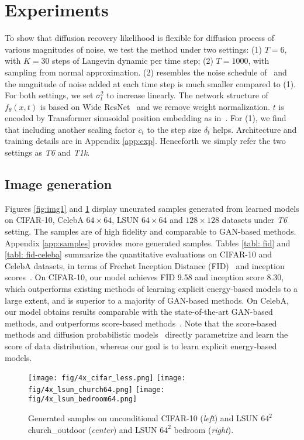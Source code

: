 \documentclass{article} \usepackage{iclr2021_conference,times}
\begin{document}
\section{Experiments}
To show that diffusion recovery likelihood is flexible for diffusion process of various magnitudes of noise, we test the method under two settings: (1) $T=6$, with $K=30$ steps of Langevin dynamic per time step; (2) $T = 1000$, with sampling from normal approximation. (2) resembles the noise schedule of~\citet{ho2020denoising} and the magnitude of noise added at each time step is much smaller compared to (1). For both settings, we set $\sigma_t^2$ to increase linearly. The network structure of $f_\theta(x, t)$ is based on Wide ResNet~\citep{zagoruyko2016wide} and we remove weight normalization. $t$ is encoded by Transformer sinusoidal position embedding as in~\citep{ho2020denoising}. For (1), we find that including another scaling factor $c_t$ to the step size $\delta_t$ helps. Architecture and training details are in Appendix \ref{app:exp}. Henceforth we simply refer the two settings as {\em T6} and {\em T1k}. 

\subsection{Image generation}
Figures \ref{fig:img1} and \ref{fig:img2} display uncurated samples generated from learned models on CIFAR-10, CelebA $64 \times 64$, LSUN $64 \times 64$ and $128 \times 128$ datasets under {\em T6} setting. The samples are of high fidelity and comparable to GAN-based methods. Appendix \ref{app:samples} provides more generated samples. Tables \ref{tabl: fid} and \ref{tabl: fid-celeba} summarize the quantitative evaluations on CIFAR-10 and CelebA datasets, in terms of Frechet Inception Distance (FID)~\citep{heusel2017gans} and inception scores~\citep{salimans2016improved}. On CIFAR-10, our model achieves FID 9.58 and inception score 8.30, which outperforms existing methods of learning explicit energy-based models to a large extent, and is superior to a majority of GAN-based methods. On CelebA, our model obtains results comparable with the state-of-the-art GAN-based methods, and outperforms score-based methods~\citep{song2019generative,song2020improved}.  Note that the score-based methods \citep{song2019generative,song2020improved} and diffusion probabilistic models~\citep{ho2020denoising} directly parametrize and learn the score of data distribution, whereas our goal is to learn explicit energy-based models. 
\begin{figure}[ht]
\begin{center}
\texttt{[image: fig/4x\_cifar\_less.png]}
\texttt{[image: fig/4x\_lsun\_church64.png]}
\texttt{[image: fig/4x\_lsun\_bedroom64.png]}
\end{center}
\caption{Generated samples on unconditional CIFAR-10 ({\em left}) and LSUN $64^2$ church\_outdoor ({\em center}) and LSUN $64^2$ bedroom ({\em right}).}
\label{fig:img2}
\end{figure}
\end{document}
